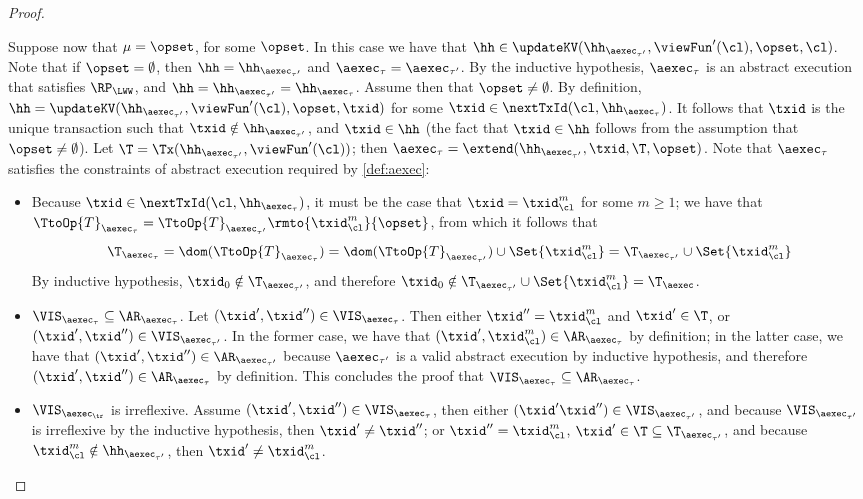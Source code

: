 \begin{proof}
\begin{itemize}
Suppose now that $\mu = \opset$, for some $\opset$. In this case we have that  
$\hh \in \updateKV(\hh_{\aexec_{\tau'}}, \viewFun'(\cl), \opset, \cl)$. Note that if 
$\opset = \emptyset$, then $\hh = \hh_{\aexec_{\tau'}}$ and $\aexec_{\tau} = \aexec_{\tau'}$. 
By the inductive hypothesis, $\aexec_{\tau}$ is an abstract execution that satisfies 
$\RP_{\LWW}$, and $\hh = \hh_{\aexec_{\tau'}} = \hh_{\aexec_{\tau}}$. 
Assume then that $\opset \neq \emptyset$. By definition, $\hh = \updateKV(\hh_{\aexec_{\tau'}}, 
\viewFun'(\cl), \opset, \txid)$ for some $\txid \in \nextTxId(\cl, \hh_{\aexec_{\tau}})$. It follows that $\txid$ 
is the unique transaction such that $\txid \notin \hh_{\aexec_{\tau'}}$, and $\txid \in \hh$ 
(the fact that $\txid \in \hh$ follows from the assumption that $\opset \neq \emptyset$). Let 
$\T = \Tx(\hh_{\aexec_{\tau'}}, \viewFun'(\cl))$; then $\aexec_{\tau} = \extend(\hh_{\aexec_{\tau'}}, \txid, \T, \opset)$. 
Note that $\aexec_{\tau}$ satisfies the constraints of abstract execution required by \cref{def:aexec}:
\begin{itemize}
\item  Because $\txid \in \nextTxId(\cl, \hh_{\aexec_{\tau}})$, it must be the case that $\txid = \txid_{\cl}^{m}$ for some 
$m \geq 1$; we have that $\TtoOp{T}_{\aexec_{\tau}} = \TtoOp{T}_{\aexec_{\tau'}}\rmto{\txid_{\cl}^{m}}{\opset}$, 
from which it follows that 
\[
\T_{\aexec_{\tau}} = \dom(\TtoOp{T}_{\aexec_{\tau}}) = \dom(\TtoOp{T}_{\aexec_{\tau'}}) \cup 
\Set{\txid_{\cl}^{m} } = \T_{\aexec_{\tau'}} \cup \Set{\txid_{\cl}^{m} }
\]
By inductive hypothesis, $\txid_0 \notin \T_{\aexec_{\tau'}}$, and therefore $\txid_{0} \notin 
\T_{\aexec_{\tau'}} \cup \Set{\txid_{\cl}^{m} } = \T_{\aexec}$.

\item \( \VIS_{\aexec_{\tau}} \subseteq \AR_{\aexec_{\tau}} \).
    Let $(\txid' ,\txid'') \in \VIS_{\aexec_{\tau}}$. Then either $\txid'' = \txid_{\cl}^{m}$ and $\txid' \in \T$, or $(\txid', \txid'') \in 
\VIS_{\aexec_{\tau'}}$. In the former case, we have that $(\txid', \txid_{\cl}^{m}) \in \AR_{\aexec_{\tau}}$ by definition; 
in the latter case, we have that $(\txid', \txid'') \in \AR_{\aexec_{\tau'}}$ because $\aexec_{\tau'}$ is a valid 
abstract execution by inductive hypothesis, and therefore $(\txid', \txid'') \in \AR_{\aexec_{\tau}}$ by definition. 
This concludes the proof that $\VIS_{\aexec_{\tau}} \subseteq \AR_{\aexec_{\tau}}$. 
\item \( \VIS_{\aexec_\tr} \) is irreflexive.
Assume $(\txid', \txid'') \in \VIS_{\aexec_{\tau}}$, then either 
$(\txid' \txid'') \in \VIS_{\aexec_{\tau'}}$, and because $\VIS_{\aexec_{\tau'}}$ is irreflexive by the inductive hypothesis, 
then $\txid' \neq \txid''$; 
or $\txid'' = \txid_{\cl}^{m}$, $\txid' \in \T \subseteq \T_{\aexec_{\tau'}}$, 
and because $\txid_{\cl}^{m} \notin \hh_{\aexec_{\tau'}}$, then $\txid' \neq \txid_{\cl}^{m}$. 


\end{itemize}
\end{itemize}
\end{proof}
